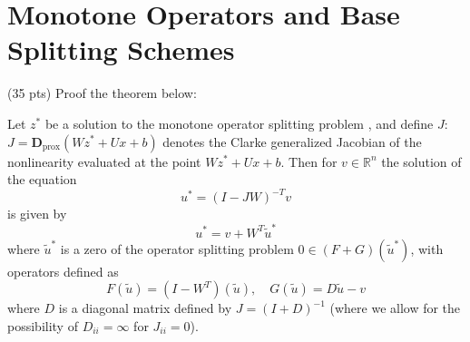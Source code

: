 \section{Monotone Operators and Base Splitting Schemes}
{\color{red} (35 pts)} Proof the theorem below:
\begin{theorem}
Let \(z^*\) be a solution to the monotone operator splitting problem , and define \(J\): $J = \mathbf{D}_{\text{prox}}(Wz^* + Ux + b)$ denotes the Clarke generalized Jacobian of the nonlinearity evaluated at the point \(Wz^* + Ux + b\). Then for \(v \in \mathbb{R}^n\) the solution of the equation
\begin{equation}
u^* = (I - JW)^{-T}v
\end{equation}
is given by
\begin{equation}
u^* = v + W^T\tilde{u}^*
\end{equation}
where \(\tilde{u}^*\) is a zero of the operator splitting problem \(0 \in (F + G)(\tilde{u}^*)\), with operators defined as
\begin{equation}
F(\tilde{u}) = (I - W^T)(\tilde{u}), \quad G(\tilde{u}) = D\tilde{u} - v
\end{equation}
where \(D\) is a diagonal matrix defined by \(J = (I + D)^{-1}\) (where we allow for the possibility of \(D_{ii} = \infty\) for \(J_{ii} = 0\)).
\end{theorem}

\solution{}





